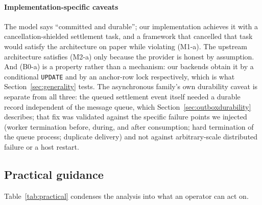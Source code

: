 \documentclass[final,5p,times,twocolumn,number]{elsarticle}
\begin{document}
\paragraph{Implementation-specific caveats}
The model says ``committed and durable''; our implementation achieves it with a
cancellation-shielded settlement task, and a framework that cancelled that task would
satisfy the architecture on paper while violating (M1-a). The upstream architecture
satisfies (M2-a) only because the provider is honest by assumption. And (B0-a) is a
property rather than a mechanism: our backends obtain it by a conditional \texttt{UPDATE}
and by an anchor-row lock respectively, which is what Section~\ref{sec:generality} tests.
The asynchronous family's own durability caveat is separate from all three: the queued
settlement event itself needed a durable record independent of the message queue, which
Section~\ref{sec:outboxdurability} describes; that fix was validated against the specific
failure points we injected (worker termination before, during, and after consumption;
hard termination of the queue process; duplicate delivery) and not against arbitrary-scale
distributed failure or a host restart.

\subsection{Practical guidance}
Table~\ref{tab:practical} condenses the analysis into what an operator can act on.
\end{document}
